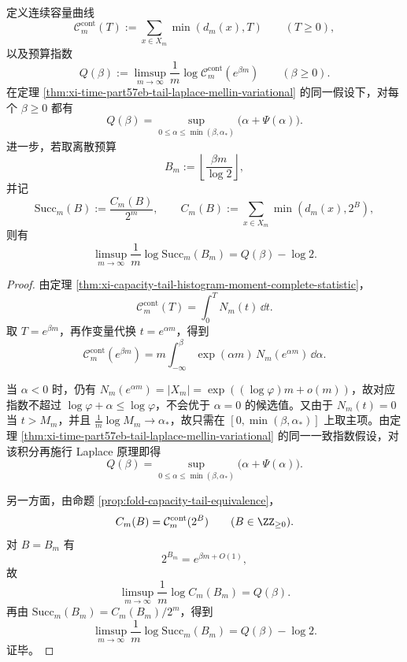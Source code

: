 \begin{theorem}[连续容量曲线的变分公式与成功率指数]\label{thm:xi-time-part57eb-continuous-capacity-success-variational}
定义连续容量曲线
\[
\mathcal C_m^{\mathrm{cont}}(T):=\sum_{x\in X_m}\min(d_m(x),T)
\qquad(T\ge 0),
\]
以及预算指数
\[
Q(\beta):=\limsup_{m\to\infty}\frac1m\log \mathcal C_m^{\mathrm{cont}}(e^{\beta m})
\qquad(\beta\ge 0).
\]
在定理 \ref{thm:xi-time-part57eb-tail-laplace-mellin-variational} 的同一假设下，对每个 \(\beta\ge 0\) 都有
\[
\boxed{\;
Q(\beta)=\sup_{0\le \alpha\le \min(\beta,\alpha_*)}\bigl(\alpha+\Psi(\alpha)\bigr).\;}
\]
进一步，若取离散预算
\[
B_m:=\left\lfloor \frac{\beta m}{\log 2}\right\rfloor,
\]
并记
\[
\mathrm{Succ}_m(B):=\frac{C_m(B)}{2^m},
\qquad
C_m(B):=\sum_{x\in X_m}\min(d_m(x),2^B),
\]
则有
\[
\boxed{\;
\limsup_{m\to\infty}\frac1m\log \mathrm{Succ}_m(B_m)
=
Q(\beta)-\log 2.\;}
\]
\end{theorem}
\begin{proof}
由定理 \ref{thm:xi-capacity-tail-histogram-moment-complete-statistic}，
\[
\mathcal C_m^{\mathrm{cont}}(T)=\int_0^T N_m(t)\,\dd t.
\]
取 \(T=e^{\beta m}\)，再作变量代换 \(t=e^{\alpha m}\)，得到
\[
\mathcal C_m^{\mathrm{cont}}(e^{\beta m})
=
m\int_{-\infty}^{\beta}\exp(\alpha m)\,N_m(e^{\alpha m})\,\dd\alpha.
\]

当 \(\alpha<0\) 时，仍有 \(N_m(e^{\alpha m})=|X_m|=\exp((\log\varphi)m+o(m))\)，故对应指数不超过 \(\log\varphi+\alpha\le \log\varphi\)，不会优于 \(\alpha=0\) 的候选值。又由于 \(N_m(t)=0\) 当 \(t>M_m\)，并且 \(\frac1m\log M_m\to\alpha_*\)，故只需在 \([0,\min(\beta,\alpha_*)]\) 上取主项。由定理 \ref{thm:xi-time-part57eb-tail-laplace-mellin-variational} 的同一一致指数假设，对该积分再施行 Laplace 原理即得
\[
Q(\beta)=\sup_{0\le \alpha\le \min(\beta,\alpha_*)}\bigl(\alpha+\Psi(\alpha)\bigr).
\]

另一方面，由命题 \ref{prop:fold-capacity-tail-equivalence}，
\[
C_m(B)=\mathcal C_m^{\mathrm{cont}}(2^B)
\qquad(B\in\ZZ_{\ge 0}).
\]
对 \(B=B_m\) 有
\[
2^{B_m}=e^{\beta m+O(1)},
\]
故
\[
\limsup_{m\to\infty}\frac1m\log C_m(B_m)=Q(\beta).
\]
再由 \(\mathrm{Succ}_m(B_m)=C_m(B_m)/2^m\)，得到
\[
\limsup_{m\to\infty}\frac1m\log \mathrm{Succ}_m(B_m)=Q(\beta)-\log 2.
\]
证毕。
\end{proof}

